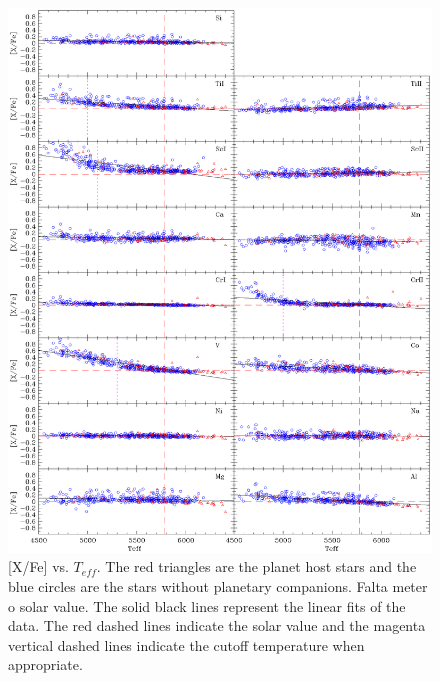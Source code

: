\documentclass[dvips,12pt,a4paper]{report}
\begin{document}
{{\begin{figure}[h]
\centering
\includegraphics[trim=0cm 2cm 0cm 1cm,clip,width=16cm]{pics/parte3/xfeteff.eps}
\caption[depois]{[X/Fe] vs. $T_{eff}$. The red triangles are the planet host stars and the blue circles are the stars without planetary companions. Falta meter o solar value. The solid black lines represent the linear fits of the data. The red dashed lines indicate the solar value and the magenta vertical dashed lines indicate the cutoff temperature when appropriate.}
\label{xfeteff}
\end{figure}

}}
\end{document}
